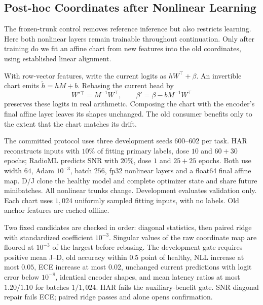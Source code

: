 \subsection{Post-hoc Coordinates after Nonlinear Learning}\label{app:posthoc_chart}

The frozen-trunk control removes reference inference but also restricts learning.
Here both nonlinear layers remain trainable throughout continuation. Only after
training do we fit an affine chart from new features into the old coordinates,
using established linear alignment.

With row-vector features, write the current logits as $hW^\top+\beta$.
An invertible chart emits $\widetilde h=hM+b$. Rebasing the current head by
\begin{equation}
 W'{}^\top=M^{-1}W^\top,\qquad
 \beta'=\beta-bM^{-1}W^\top
 \label{eq:chart_rebase}
\end{equation}
preserves these logits in real arithmetic. Composing the chart with the
encoder's final affine layer leaves its shapes unchanged. The old consumer benefits only to the extent that the chart matches its drift.

The committed protocol uses three development seeds $600$--$602$ per task.
HAR reconstructs inputs with $10\%$ of fitting primary labels, dose $10$ and
$60+30$ epochs; RadioML predicts SNR with $20\%$, dose $1$ and $25+25$ epochs.
Both use width $64$, Adam $10^{-3}$, batch $256$, fp32 nonlinear layers and a
float64 final affine map. D/J clone the healthy model and complete optimizer
state and share future minibatches. All nonlinear trunks change. Development
evaluates validation only. Each chart uses $1{,}024$ uniformly sampled fitting
inputs, with no labels. Old anchor features are cached offline.

Two fixed candidates are checked in order: diagonal statistics, then paired
ridge with standardized coefficient $10^{-3}$. Singular values of the raw
coordinate map are floored at $10^{-3}$ of the largest before rebasing.
The development gate requires positive mean J--D, old accuracy within $0.5$
point of healthy, NLL increase at most $0.05$, ECE increase at most $0.02$,
unchanged current predictions with logit error below $10^{-8}$, identical
encoder shapes, and mean latency ratios at most $1.20/1.10$ for batches
$1/1{,}024$. HAR fails the auxiliary-benefit gate. SNR diagonal repair fails
ECE; paired ridge passes and alone opens confirmation.



